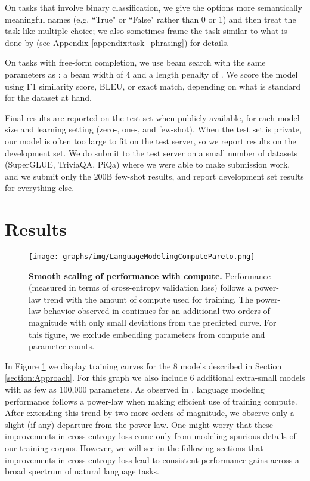 \documentclass{article}
\begin{document}
On tasks that involve binary classification, we give the options more semantically meaningful names (e.g. ``True" or ``False" rather than 0 or 1) and then treat the task like multiple choice; we also sometimes frame the task similar to what is done by \cite{raffel2019t5} (see Appendix \ref{appendix:task_phrasing}) for details.

On tasks with free-form completion, we use beam search with the same parameters as \cite{raffel2019t5}: a beam width of 4 and a length penalty of .  We score the model using F1 similarity score, BLEU, or exact match, depending on what is standard for the dataset at hand.

Final results are reported on the test set when publicly available, for each model size and learning setting (zero-, one-, and few-shot).  When the test set is private, our model is often too large to fit on the test server, so we report results on the development set.  We do submit to the test server on a small number of datasets (SuperGLUE, TriviaQA, PiQa) where we were able to make submission work, and we submit only the 200B few-shot results, and report development set results for everything else. 
 
\section{Results}
\label{section:Results}
\begin{figure}
\centering\texttt{[image: graphs/img/LanguageModelingComputePareto.png]}
\caption{\textbf{Smooth scaling of performance with compute.} Performance (measured in terms of cross-entropy validation loss) follows a power-law trend with the amount of compute used for training. The power-law behavior observed in \cite{kaplan2020scaling} continues for an additional two orders of magnitude with only small deviations from the predicted curve.  For this figure, we exclude embedding parameters from compute and parameter counts.}
\label{graph:compute}
\end{figure} 
In Figure \ref{graph:compute} we display training curves for the 8 models described in Section \ref{section:Approach}. For this graph we also include 6 additional extra-small models with as few as 100,000 parameters. As observed in \cite{kaplan2020scaling}, language modeling performance follows a power-law when making efficient use of training compute. After extending this trend by two more orders of magnitude, we observe only a slight (if any) departure from the power-law. One might worry that these improvements in cross-entropy loss come only from modeling spurious details of our training corpus. However, we will see in the following sections that improvements in cross-entropy loss lead to consistent performance gains across a broad spectrum of natural language tasks.
\end{document}

